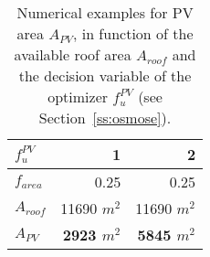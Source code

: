\begin{table}[htp]
	\centering
	\caption{Numerical examples for PV area $A_{PV}$, in function of the available roof area $A_{roof}$ and the decision variable of the optimizer $f_{u}^{PV}$ (see Section~\ref{ss:osmose}).}
	\label{tab:pv}
	\begin{tabular}{lrr} \toprule
		$f_{u}^{PV}$			& 1	& 2\\  \midrule
		$f_{area}$	 & 0.25	& 0.25 \\
		$A_{roof}$          & 11690 $m^2$   & 11690 $m^2$ \\
		\textbf{$A_{PV}$}	 & \textbf{	2923 $m^2$}	& \textbf{5845 $m^2$}\\ \bottomrule
	\end{tabular}
\end{table}